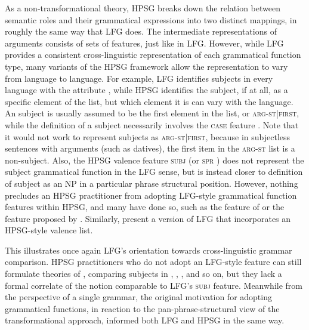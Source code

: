 As a non-transformational theory, HPSG breaks down the relation between semantic roles and their grammatical expressions into two distinct mappings, in roughly the same way that LFG does.  The intermediate representations of arguments consists of sets of features, just like in LFG.  However, while LFG provides a consistent cross-linguistic representation of each grammatical function type, many variants of the HPSG framework allow the representation to vary from language to language.  For example, LFG identifies subjects in every language with the attribute , while HPSG identifies the subject, if at all, as a specific element of the  list, but which element it is can vary with the language.  An  subject is usually assumed to be the first element in the list, or \textsc{arg-st|first}, while the definition of a  subject necessarily involves the \textsc{case} feature \citep{Reis82}.  Note that it would not work to represent  subjects as \textsc{arg-st|first}, because in   subjectless sentences with arguments (such as datives),  the first item in the \textsc{arg-st} list is a non-subject.  Also, the HPSG valence feature \textsc{subj} (or \textsc{spr} ) 
does not represent the subject grammatical function in the LFG sense, but is instead closer to  
 definition of subject as an NP in a particular phrase structural position.  However, nothing precludes an HPSG practitioner from adopting LFG-style grammatical function features within HPSG, and many have done so, such as the  feature of \citet{KDHB2007a} or the  feature proposed by \citet{Pollard94a}.  Similarly, \citet{andrews1999complex} present a version of LFG that incorporates an HPSG-style valence list.  

This illustrates once again LFG's orientation towards cross-linguistic grammar comparison.  HPSG practitioners who do not adopt an LFG-style  feature can still formulate theories of , comparing subjects in , , , and so on, but they lack a formal correlate of the notion  comparable to LFG's \textsc{subj} feature.  Meanwhile from the perspective of a single grammar, the original motivation for adopting grammatical functions, in reaction to the pan-phrase-structural view of the transformational approach, informed both LFG and HPSG in the same way.  

